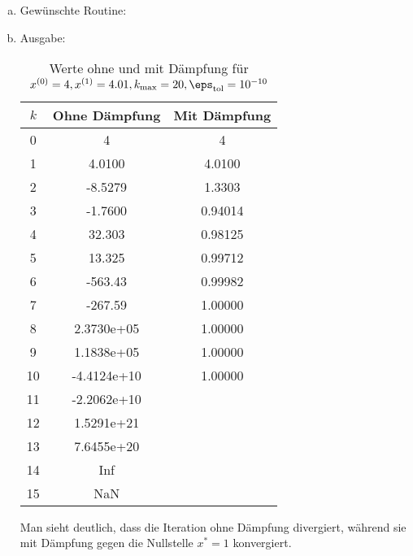 \documentclass[a4paper]{scrartcl}
\begin{document}
\setcounter{aufgabe}{3}
 
\begin{aufgabe}
	
	\begin{enumerate}[a)]
		\item
			Gewünschte Routine:
			
		\item
			Ausgabe:
			
			\begin{table}[h]
				\caption{Werte ohne und mit Dämpfung für $x^{(0)}=4, x^{(1)}=4.01, k_{\text{max}}=20, \eps_{\text{tol}}=10^{-10}$}
				\centering
				\begin{tabular}{c|c|c}
					$k$ & Ohne Dämpfung & Mit Dämpfung \\ \hline
					0 & 4 & 4 \\
					1 & 4.0100 & 4.0100 \\
					2 & -8.5279 & 1.3303 \\
					3 & -1.7600 & 0.94014 \\
					4 & 32.303 & 0.98125 \\
					5 & 13.325 & 0.99712 \\
					6 & -563.43 & 0.99982 \\
					7 & -267.59 & 1.00000 \\
					8 & 2.3730e+05 & 1.00000 \\
					9 & 1.1838e+05 & 1.00000 \\
					10 & -4.4124e+10 & 1.00000 \\
					11 & -2.2062e+10 &  \\
					12 & 1.5291e+21 &  \\
					13 & 7.6455e+20 & \\
					14 & Inf & \\
					15 & NaN
				\end{tabular}				
			\end{table}
			Man sieht deutlich, dass die Iteration ohne Dämpfung divergiert, während sie mit Dämpfung gegen die Nullstelle $x^* = 1$ konvergiert.

	\end{enumerate}
\end{aufgabe}
\end{document}
